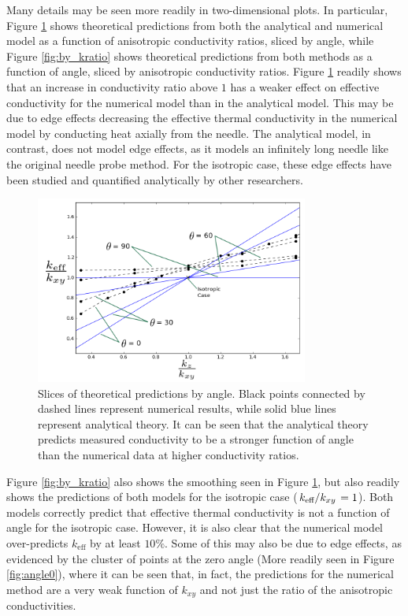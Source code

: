 Many details may be seen more readily in two-dimensional plots. In particular,
Figure \ref{fig:by_angle} shows theoretical predictions from both the analytical
and numerical model as a function of anisotropic conductivity ratios, sliced by
angle, while Figure \ref{fig:by_kratio} shows theoretical predictions from both
methods as a function of angle, sliced by anisotropic conductivity ratios.
Figure \ref{fig:by_angle} readily shows that an increase in conductivity ratio
above \(1\) has a weaker effect on effective conductivity for the numerical
model than in the analytical model. This may be due to edge effects decreasing
the effective thermal conductivity in the numerical model by conducting heat
axially from the needle. The analytical model, in contrast, does not model edge
effects, as it models an infinitely long needle like the
original needle probe method. For the isotropic case, these edge effects have
been studied and quantified analytically by other researchers. \cite{axialerror}

\begin{figure}[h]
\centering
\includegraphics[width=0.8\textwidth]{fig/byAngle.png}
\caption{Slices of theoretical predictions by angle. Black points connected by dashed lines represent numerical results, while solid blue lines represent analytical theory. It can be seen that the analytical theory predicts measured conductivity to be a stronger function of angle than the numerical data at
higher conductivity ratios.}
\label{fig:by_angle}
\end{figure}

Figure \ref{fig:by_kratio} also shows the smoothing seen in Figure 
\ref{fig:by_angle}, but also readily shows the predictions of both models for
the isotropic case (\(\left.{k_{\textrm{eff}}}\middle/{k_{xy}}\right. = 1\)). Both models
correctly predict that effective thermal conductivity is not a function of angle
for the isotropic case. However, it is also clear that the numerical model
over-predicts \(k_{\textrm{eff}}\) by at least \(10\%\). Some of this may also
be due to edge effects, as evidenced by the cluster of points at the zero angle
(More readily seen in Figure \ref{fig:angle0}), where it can be seen that, in fact,
the predictions for the numerical method are a very weak function of \(k_{xy}\)
and not just the ratio of the anisotropic conductivities. 

